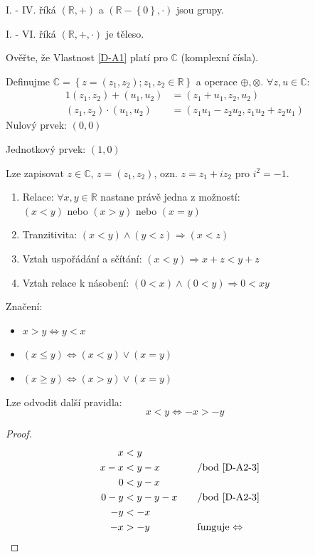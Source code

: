 I. - IV. říká $(\mathbb{R}, +)$ a $(\mathbb{R} - \left\{0\right\}, \cdot)$ jsou grupy.

I. - VI. říká $(\mathbb{R}, +, \cdot)$ je těleso.

Ověřte, že Vlastnost \ref{D-A1} platí pro $\mathbb{C}$ (komplexní čísla).

\begin{example}
	Definujme $\mathbb{C} = \left\{z = (z_1, z_2); z_1, z_2 \in \mathbb{R}\right\}$ a
		operace $\oplus, \otimes$. $\forall z, u \in \mathbb{C}:$
	\begin{alignat}{1}
		(z_1, z_2) + (u_1, u_2) &= (z_1 + u_1, z_2, u_2) \\
		(z_1, z_2) \cdot (u_1, u_2) &= (z_1u_1 - z_2u_2, z_1u_2 + z_2u_1)
	\end{alignat}
	Nulový prvek: $(0, 0)$
	
	Jednotkový prvek: $(1, 0)$

	Lze zapisovat $z\in \mathbb{C}$, $z = (z_1, z_2)$, ozn. $z = z_1 + iz_2$ pro $i^2 = -1$.
\end{example}
\begin{definitionAi}[Uspořádání]
	\begin{enumerate}[I]
		\item Relace: $\forall x, y \in \mathbb{R}$ nastane právě jedna z možností: \\
		$(x<y)$ nebo $(x>y)$ nebo $(x=y)$
		\item Tranzitivita: $(x<y) \land (y<z) \Rightarrow (x<z)$
		\item\label{D-A2-3} Vztah uspořádání a sčítání: $(x<y) \Rightarrow x+z < y+z$
		\item\label{D-A2-4} Vztah relace k násobení: $(0<x) \land (0<y) \Rightarrow 0 < xy$
	\end{enumerate}
\end{definitionAi}

Značení:
\begin{itemize}
	\item $x>y \Leftrightarrow y<x$
	\item $(x\leq y) \Leftrightarrow (x<y) \lor (x=y)$
	\item $(x\geq y) \Leftrightarrow (x>y) \lor (x=y)$
\end{itemize}

Lze odvodit další pravidla:
\begin{equation}\label{RelationsOfNegatives}
	x<y \Leftrightarrow -x > -y
\end{equation}
\begin{proof}
	\begin{alignat*}{2}
		x&<y \\
		x-x&<y-x &&\text{\quad /bod \ref{D-A2-3}} \\
		0&<y-x \\
		0-y&<y-y-x &&\text{\quad /bod \ref{D-A2-3}} \\
		-y&<-x \\
		-x&>-y &&\text{\quad funguje $\Leftrightarrow$}
	\end{alignat*}
\end{proof}

